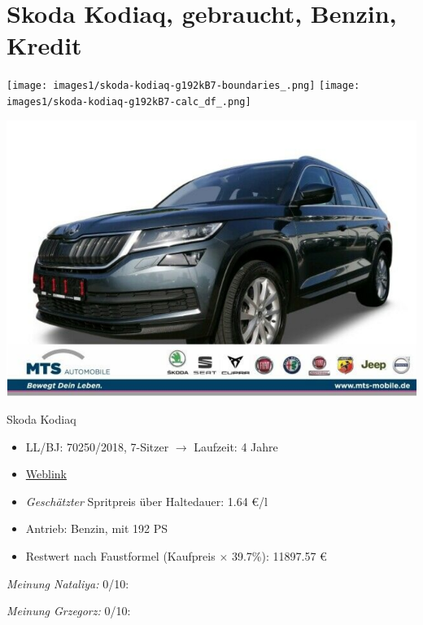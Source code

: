 \documentclass[landscape, DIV=99, 14pt]{scrartcl}
\begin{document}
\pagebreak


\twocolumn

\section*{Skoda Kodiaq, gebraucht, Benzin, Kredit}
\begin{center}
\texttt{[image: images1/skoda-kodiaq-g192kB7-boundaries\_.png]}
\null
\vspace{0.5cm}
\texttt{[image: images1/skoda-kodiaq-g192kB7-calc\_df\_.png]}
\end{center}

\pagebreak
\begin{center}
\includegraphics[width=0.9\columnwidth]{cars/skoda-kodiaq-4x4-2p0-tsi.png}

Skoda Kodiaq
\end{center}

\begin{itemize}
    \item LL/BJ: 70250/2018, 7-Sitzer $\rightarrow$ Laufzeit: 4 Jahre
    \item \href{https://suchen.mobile.de/fahrzeuge/details.html?action=parkItem&id=336255689}{Weblink}
    \item \emph{Gesch\"atzter} Spritpreis \"uber Haltedauer: 1.64 \euro{}/l
    \item Antrieb: Benzin, mit 192 PS
    \item Restwert nach Faustformel (Kaufpreis $\times$ 39.7\%): 11897.57 \euro{}
\end{itemize}

\begin{small}
\emph{Meinung Nataliya:} 0/10: 
        
\emph{Meinung Grzegorz:} 0/10: 
\end{small}
\end{document}

